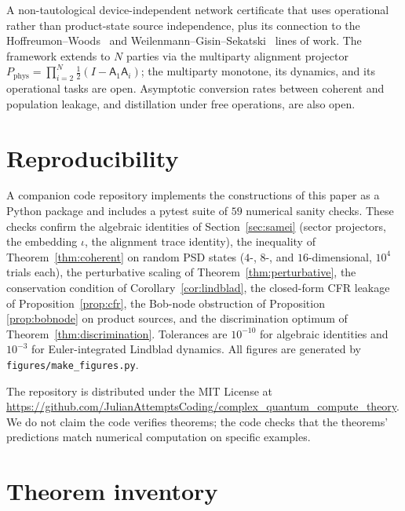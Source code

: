 \documentclass[a4paper,onecolumn,noarxiv]{quantumarticle}
\theoremstyle{plain}
\theoremstyle{definition}
\theoremstyle{remark}
\newcommand{\Aop}{\mathsf{A}}
\begin{document}
A non-tautological device-independent network certificate that uses operational
rather than product-state source independence, plus its connection to the
Hoffreumon--Woods~\cite{HoffreumonWoods2025,HoffreumonWoodsNonFalsified} and
Weilenmann--Gisin--Sekatski~\cite{WeilenmannGisinSekatski2025} lines of work. The
framework extends to $N$ parties via the multiparty alignment projector
$P_{\mathrm{phys}}=\prod_{i=2}^N\tfrac{1}{2}(I-\Aop_1\Aop_i)$; the multiparty
monotone, its dynamics, and its operational tasks are open. Asymptotic conversion
rates between coherent and population leakage, and distillation under free
operations, are also open.

\section{Reproducibility}
\label{sec:reproducibility}

A companion code repository implements the constructions of this paper as a Python
package and includes a pytest suite of $59$ numerical sanity checks. These checks
confirm the algebraic identities of Section~\ref{sec:samei} (sector projectors, the
embedding $\iota$, the alignment trace identity), the inequality of
Theorem~\ref{thm:coherent} on random PSD states ($4$-, $8$-, and $16$-dimensional,
$10^4$ trials each), the perturbative scaling of Theorem~\ref{thm:perturbative}, the
conservation condition of Corollary~\ref{cor:lindblad}, the closed-form CFR leakage
of Proposition~\ref{prop:cfr}, the Bob-node obstruction of Proposition~%
\ref{prop:bobnode} on product sources, and the discrimination optimum of
Theorem~\ref{thm:discrimination}. Tolerances are $10^{-10}$ for algebraic identities
and $10^{-3}$ for Euler-integrated Lindblad dynamics. All figures are generated by
\texttt{figures/make\_figures.py}.

The repository is distributed under the MIT License at
\url{https://github.com/JulianAttemptsCoding/complex_quantum_compute_theory}.
We do not claim the code verifies theorems; the code checks that the theorems'
predictions match numerical computation on specific examples.




\appendix

\section{Theorem inventory}
\label{app:inventory}
\end{document}
